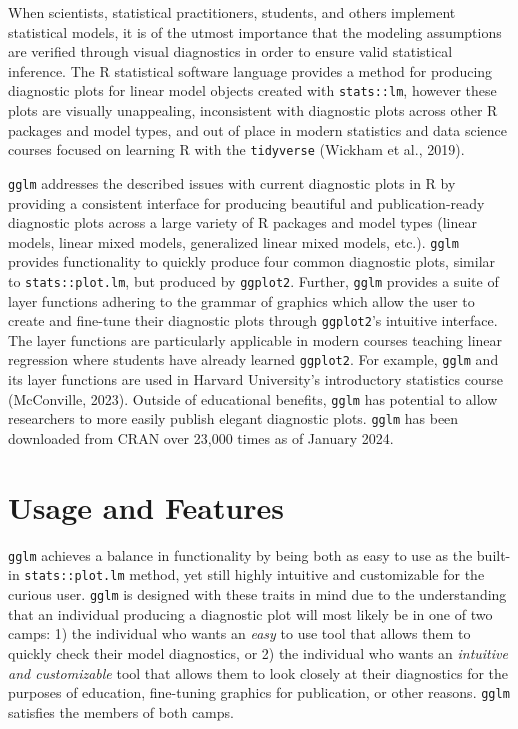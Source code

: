\documentclass[10pt,a4paper,onecolumn]{article}
\begin{document}
When scientists, statistical practitioners, students, and others
implement statistical models, it is of the utmost importance that the
modeling assumptions are verified through visual diagnostics in order to
ensure valid statistical inference. The R statistical software language
provides a method for producing diagnostic plots for linear model
objects created with \texttt{stats::lm}, however these plots are
visually unappealing, inconsistent with diagnostic plots across other R
packages and model types, and out of place in modern statistics and data
science courses focused on learning R with the \texttt{tidyverse}
(Wickham et al., 2019).

\texttt{gglm} addresses the described issues with current diagnostic
plots in R by providing a consistent interface for producing beautiful
and publication-ready diagnostic plots across a large variety of R
packages and model types (linear models, linear mixed models,
generalized linear mixed models, etc.). \texttt{gglm} provides
functionality to quickly produce four common diagnostic plots, similar
to \texttt{stats::plot.lm}, but produced by \texttt{ggplot2}. Further,
\texttt{gglm} provides a suite of layer functions adhering to the
grammar of graphics which allow the user to create and fine-tune their
diagnostic plots through \texttt{ggplot2}'s intuitive interface. The
layer functions are particularly applicable in modern courses teaching
linear regression where students have already learned \texttt{ggplot2}.
For example, \texttt{gglm} and its layer functions are used in Harvard
University's introductory statistics course (McConville, 2023). Outside
of educational benefits, \texttt{gglm} has potential to allow
researchers to more easily publish elegant diagnostic plots.
\texttt{gglm} has been downloaded from CRAN over 23,000 times as of
January 2024.

\hypertarget{usage-and-features}{%
\section{Usage and Features}\label{usage-and-features}}

\texttt{gglm} achieves a balance in functionality by being both as easy
to use as the built-in \texttt{stats::plot.lm} method, yet still highly
intuitive and customizable for the curious user. \texttt{gglm} is
designed with these traits in mind due to the understanding that an
individual producing a diagnostic plot will most likely be in one of two
camps: 1) the individual who wants an \emph{easy} to use tool that
allows them to quickly check their model diagnostics, or 2) the
individual who wants an \emph{intuitive and customizable} tool that
allows them to look closely at their diagnostics for the purposes of
education, fine-tuning graphics for publication, or other reasons.
\texttt{gglm} satisfies the members of both camps.
\end{document}
